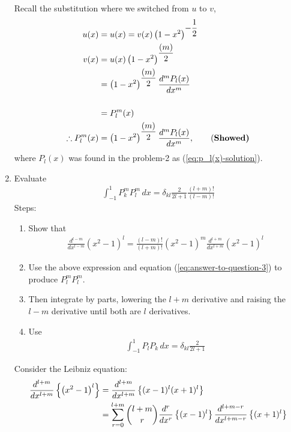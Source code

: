 \begin{enumerate}
    Recall the substitution where we switched from $u$ to $v$,
    \begin{align}
        u(x)&=u(x)=v(x)\left(1-x^2\right)^{\displaystyle-\frac{1}{2}}\notag\\
        v(x)&=u(x)\left(1-x^2\right)^{\displaystyle\frac{(m)}{2}}\notag\\
        &=\left(1-x^2\right)^{\displaystyle\frac{(m)}{2}}\frac{d^m P_l(x)}{dx^m}\notag\\[15pt]
        &=P_l^m(x)\notag\\
        \therefore P_l^m(x)&=\left(1-x^2\right)^{\displaystyle\frac{(m)}{2}}\frac{d^m P_l(x)}{dx^m},\qquad\text{(\bf Showed)}\label{eq:answer-to-question-3}
    \end{align}
    where $P_l(x)$ was found in the problem-2 as (\ref{eq:p_l(x)-solution}).
    \bigskip\bigskip\hline\hline\bigskip
    \item Evaluate 
    \begin{align}
        \int_{-1}^{1} P_k^m P_l^m \, dx = \delta_{kl} \frac{2}{2l+1} \frac{(l+m)!}{(l-m)!}
    \end{align}
    Steps:
    \begin{enumerate}[label=(\alph*)]
        \item Show that
        \begin{align*}
            \frac{d^{l-m}}{dx^{l-m}} (x^2 - 1)^l = \frac{(l-m)!}{(l+m)!} (x^2 - 1)^m \frac{d^{l+m}}{dx^{l+m}} (x^2 - 1)^l\label{eq:what-to-show}
        \end{align*}
         \item Use the above expression and equation (\ref{eq:answer-to-question-3}) to produce $P_l^m P_l^m$.
        \item Then integrate by parts, lowering the $l + m$ derivative and raising the $l - m$ derivative until both are $l$ derivatives.
        \item Use 
        \begin{align*}
            \int_{-1}^{1} P_l P_k \, dx = \delta_{kl} \frac{2}{2l+1}
        \end{align*}
    \end{enumerate}
    \bigskip\bigskip\hline\hline\bigskip
        Consider the Leibniz equation:
        \begin{align}
            \frac{d^{l+m}}{dx^{l+m}} \left\{\left(x^2-1\right)^l\right\}&=\frac{d^{l+m}}{dx^{l+m}} \left\{(x-1)^l (x+1)^l\right\}\notag\\
            &= \sum_{r=0}^{l+m} \binom{l+m}{r} \frac{d^r}{dx^r} \left\{(x-1)^l\right\} \frac{d^{l+m-r}}{dx^{l+m-r}} \left\{(x+1)^l\right\}

\end{align}
\end{enumerate}
